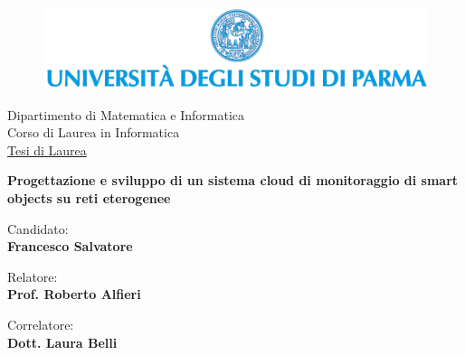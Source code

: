 \begin{titlepage}
  \hypersetup{pageanchor=false}

  \begin{center}
    \medskip

    \begin{figure}
      \centering
      \includegraphics[scale=0.52]{logouni.png}
    \end{figure}


    \begin{Large}
      Dipartimento di Matematica e Informatica \\
      \medskip
      Corso di Laurea in Informatica \\
      \medskip
      \underline{Tesi di Laurea} \\
      \vspace{2.0cm}
      
      \begin{huge}
        \textbf{Progettazione e sviluppo di un sistema cloud di monitoraggio di smart objects su reti eterogenee} \\
      \end{huge}
      
      \vspace{2.0cm}
      
      
		  \begin{flushleft}
		    Candidato: \\
		    \textbf{Francesco Salvatore} \\
		  \end{flushleft}
	  \vspace{1.0cm}
	  
	  \begin{minipage}{.45\linewidth}
		  \begin{flushleft}
		    {\small Relatore:} \\
		    \textbf{\small{Prof. Roberto Alfieri}}
		  \end{flushleft}
	  \end{minipage}
	  \hfill
	  \begin{minipage}{.45\linewidth}
		  \begin{flushright}
		    {\small Correlatore:} \\
		    \textbf{\small{Dott. Laura Belli}}
		  \end{flushright}
	   \end{minipage}
      

\end{Large}
\end{center}
\end{titlepage}
